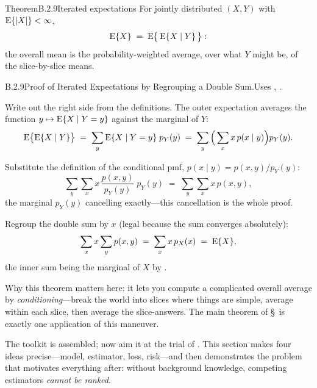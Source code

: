 \documentclass[main.tex]{subfiles}
\begin{document}
\begin{Obj}{Theorem}{B.2.9}{Iterated expectations}
For jointly distributed $(X,Y)$ with $\mathrm{E}\{|X|\}<\infty$,
\[ \mathrm{E}\{X\} \;=\; \mathrm{E}\big\{\, \mathrm{E}\{X \mid Y\} \,\big\} : \]
the overall mean is the probability-weighted average, over what $Y$ might be, of the
slice-by-slice means.
\end{Obj}
\begin{Prf}{B.2.9}{Proof of Iterated Expectations by Regrouping a Double Sum.}{Uses , .}
\item Write out the right side from the definitions. The outer expectation averages the
      function $y\mapsto\mathrm{E}\{X\mid Y=y\}$ against the marginal of $Y$:
      \[ \mathrm{E}\big\{ \mathrm{E}\{X\mid Y\} \big\}
         \;=\; \sum_y \mathrm{E}\{X \mid Y=y\}\; p_Y(y)
         \;=\; \sum_y \Big( \sum_x x\, p(x\mid y) \Big) p_Y(y) . \]
\item Substitute the definition of the conditional pmf,
      $p(x\mid y)=p(x,y)/p_Y(y)$:
      \[ \sum_y \sum_x x\,\frac{p(x,y)}{p_Y(y)}\; p_Y(y)
         \;=\; \sum_y \sum_x x\, p(x,y) , \]
      the marginal $p_Y(y)$ cancelling exactly---this cancellation is the whole proof.
\item Regroup the double sum by $x$ (legal because the sum converges absolutely):
      \[ \sum_x x \sum_y p(x,y) \;=\; \sum_x x\, p_X(x) \;=\; \mathrm{E}\{X\} , \]
      the inner sum being the marginal of $X$ by .
\end{Prf}

\medskip
Why this theorem matters here: it lets you compute a complicated overall average by
\emph{conditioning}---break the world into slices where things are simple, average within
each slice, then average the slice-answers. The main theorem of \S\, is exactly
one application of this maneuver.


The toolkit is assembled; now aim it at the trial of . This section makes four
ideas precise---model, estimator, loss, risk---and then demonstrates the problem that
motivates everything after: without background knowledge, competing estimators
\emph{cannot be ranked}.
\end{document}
